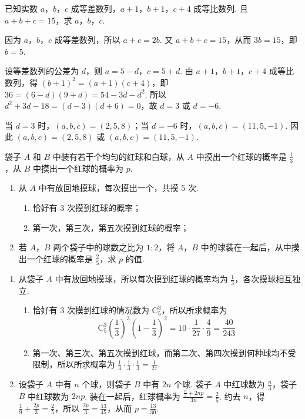 \begin{problem}
已知实数 \(a\)，\(b\)，\(c\) 成等差数列，\(a + 1\)，\(b + 1\)，\(c + 4\) 成等比数列. 且 \(a + b + c = 15\)，求 \(a\)，\(b\)，\(c\).

\begin{solution}
因为 \(a\)，\(b\)，\(c\) 成等差数列，所以 \(a+c=2b\). 又 \(a+b+c=15\)，从而 \(3b=15\)，即 \(b=5\).

设等差数列的公差为 \(d\)，则 \(a=5-d\)，\(c=5+d\). 由 \(a+1\)，\(b+1\)，\(c+4\) 成等比数列，得 \((b+1)^2=(a+1)(c+4)\)，即 \(36=(6-d)(9+d)=54-3d-d^2\). 所以 \(d^2+3d-18=(d-3)(d+6)=0\)，故 \(d=3\) 或 \(d=-6\).

当 \(d=3\) 时，\((a,b,c)=(2,5,8)\)；当 \(d=-6\) 时，\((a,b,c)=(11,5,-1)\). 因此 \((a,b,c)=(2,5,8)\) 或 \((a,b,c)=(11,5,-1)\).
\end{solution}
\end{problem}

\begin{problem}
袋子 \(A\) 和 \(B\) 中装有若干个均匀的红球和白球，从 \(A\) 中摸出一个红球的概率是 \(\frac{1}{3}\)，从 \(B\) 中摸出一个红球的概率为 \(p\).
\begin{enumerate}
\item 从 \(A\) 中有放回地摸球，每次摸出一个，共摸 5 次.
\begin{enumerate}
\item 恰好有 3 次摸到红球的概率；
\item 第一次，第三次，第五次摸到红球的概率；
\end{enumerate}
\item 若 \(A\)，\(B\) 两个袋子中的球数之比为 \(1:2\)，将 \(A\)，\(B\) 中的球装在一起后，从中摸出一个红球的概率是 \( \frac{2}{5} \)，求 \(p\) 的值.
\end{enumerate}

\begin{solution}
\begin{enumerate}
\item 从袋子 \(A\) 中有放回地摸球，所以每次摸到红球的概率均为 \(\frac{1}{3}\)，各次摸球相互独立.
\begin{enumerate}
\item 恰好有 \(3\) 次摸到红球的情况数为 \(\mathrm C_5^3\)，所以所求概率为
\[
\mathrm C_5^3\left(\frac{1}{3}\right)^3\left(1-\frac{1}{3}\right)^2
=10\cdot\frac{1}{27}\cdot\frac{4}{9}
=\frac{40}{243}
\]

\item 第一次、第三次、第五次摸到红球，而第二次、第四次摸到何种球均不受限制，所以所求概率为
\(\frac{1}{3}\cdot\frac{1}{3}\cdot\frac{1}{3}=\frac{1}{27}\).
\end{enumerate}

\item 设袋子 \(A\) 中有 \(n\) 个球，则袋子 \(B\) 中有 \(2n\) 个球. 袋子 \(A\) 中红球数为 \(\frac{n}{3}\)，袋子 \(B\) 中红球数为 \(2np\). 装在一起后，红球概率为 \(\frac{\frac{n}{3}+2np}{3n}=\frac{2}{5}\). 约去 \(n\)，得 \(\frac{1}{9}+\frac{2p}{3}=\frac{2}{5}\)，所以 \(\frac{2p}{3}=\frac{13}{45}\)，从而 \(p=\frac{13}{30}\).
\end{enumerate}
\end{solution}
\end{problem}

